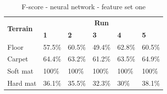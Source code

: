 \documentclass[USenglish]{ifimaster}  %
\begin{document}
\begin{table}[h]\ContinuedFloat
	\begin{subtable}[h]{1\textwidth}
		\centering
		\captionsetup{justification=centering}
		\begin{tabular}{@{}llllll@{}}
			\toprule
			\multirow{2}{*}{\textbf{Terrain}} & \multicolumn{5}{c}{\textbf{Run}} \\ \cmidrule(l){2-6} 
			& \multicolumn{1}{l|}{\textbf{1}} & \multicolumn{1}{l|}{\textbf{2}} & \multicolumn{1}{l|}{\textbf{3}} & \multicolumn{1}{l|}{\textbf{4}} & \textbf{5} \\ \midrule
			\multicolumn{1}{l|}{Floor} & \multicolumn{1}{l|}{57.5\%} & \multicolumn{1}{l|}{60.5\%} & \multicolumn{1}{l|}{49.4\%} & \multicolumn{1}{l|}{62.8\%} & 60.5\% \\ \midrule
			\multicolumn{1}{l|}{Carpet} & \multicolumn{1}{l|}{64.4\%} & \multicolumn{1}{l|}{63.2\%} & \multicolumn{1}{l|}{61.2\%} & \multicolumn{1}{l|}{63.5\%} & 64.9\% \\ \midrule
			\multicolumn{1}{l|}{Soft mat} & \multicolumn{1}{l|}{100\%} & \multicolumn{1}{l|}{100\%} & \multicolumn{1}{l|}{100\%} & \multicolumn{1}{l|}{100\%} & 100\% \\ \midrule
			\multicolumn{1}{l|}{Hard mat} & \multicolumn{1}{l|}{36.1\%} & \multicolumn{1}{l|}{35.5\%} & \multicolumn{1}{l|}{32.3\%} & \multicolumn{1}{l|}{30\%} & 38.1\% \\ \bottomrule
		\end{tabular}
		\caption{F-score - neural network - feature set one}
		\label{nnfscore}
	\end{subtable}
\end{table}
\end{document}
